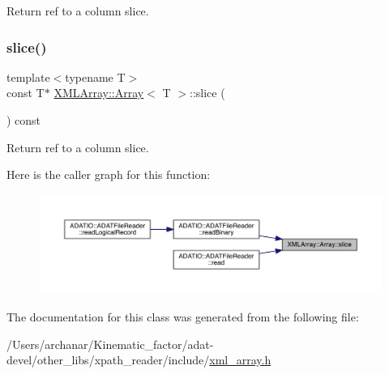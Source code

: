 Return ref to a column slice. 

\mbox{\label{classXMLArray_1_1Array_a9c9e3fdc44557d1241103c207f7f69af}} 
\subsubsection{\texorpdfstring{slice()}{slice()}\hspace{0.1cm}{\footnotesize\ttfamily [3/3]}}
{\footnotesize\ttfamily template$<$typename T$>$ \\
const T$\ast$ \mbox{\hyperlink{classXMLArray_1_1Array}{X\+M\+L\+Array\+::\+Array}}$<$ T $>$\+::slice (\begin{DoxyParamCaption}{ }\end{DoxyParamCaption}) const\hspace{0.3cm}{\ttfamily [inline]}}



Return ref to a column slice. 

Here is the caller graph for this function\+:
\nopagebreak
\begin{figure}[H]
\begin{center}
\leavevmode
\includegraphics[width=350pt]{db/d6c/classXMLArray_1_1Array_a9c9e3fdc44557d1241103c207f7f69af_icgraph}
\end{center}
\end{figure}


The documentation for this class was generated from the following file\+:\begin{DoxyCompactItemize}
\item 
/\+Users/archanar/\+Kinematic\+\_\+factor/adat-\/devel/other\+\_\+libs/xpath\+\_\+reader/include/\mbox{\hyperlink{adat-devel_2other__libs_2xpath__reader_2include_2xml__array_8h}{xml\+\_\+array.\+h}}\end{DoxyCompactItemize}
